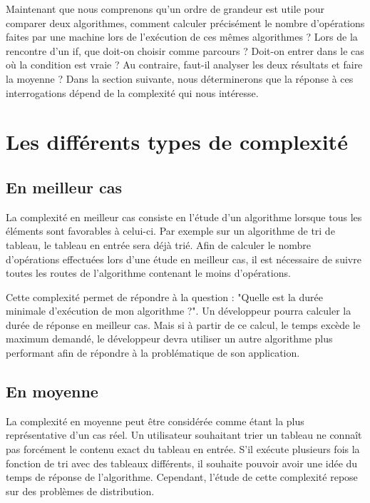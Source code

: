 \documentclass[12pt, twoside, openright]{report}
\begin{document}
Maintenant que nous comprenons qu'un ordre de grandeur est utile pour comparer deux algorithmes, comment calculer précisément le nombre d'opérations faites par une machine lors de l'exécution de ces mêmes algorithmes ? Lors de la rencontre d'un if, que doit-on choisir comme parcours ? Doit-on entrer dans le cas où la condition est vraie ? Au contraire, faut-il analyser les deux résultats et faire la moyenne ? Dans la section suivante, nous déterminerons que la réponse à ces interrogations dépend de la complexité qui nous intéresse.

\section{Les différents types de complexité}

\subsection{En meilleur cas}

La complexité en meilleur cas consiste en l'étude d'un algorithme lorsque tous les éléments sont favorables à celui-ci. Par exemple sur un algorithme de tri de tableau, le tableau en entrée sera déjà trié. Afin de calculer le nombre d'opérations effectuées lors d'une étude en meilleur cas, il est nécessaire de suivre toutes les routes de l'algorithme contenant le moins d'opérations. 

Cette complexité permet de répondre à la question : "Quelle est la durée minimale d'exécution de mon algorithme ?". Un développeur pourra calculer la durée de réponse en meilleur cas. Mais si à partir de ce calcul, le temps excède le maximum demandé, le développeur devra utiliser un autre algorithme plus performant afin de répondre à la problématique de son application. 

\subsection{En moyenne}


La complexité en moyenne peut être considérée comme étant la plus représentative d'un cas réel. Un utilisateur souhaitant trier un tableau ne connaît pas forcément le contenu exact du tableau en entrée. S'il exécute plusieurs fois la fonction de tri avec des tableaux différents, il souhaite pouvoir avoir une idée du temps de réponse de l'algorithme. Cependant, l'étude de cette complexité repose sur des problèmes de distribution.
\end{document}
